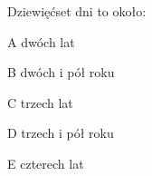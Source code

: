 \begin{tresc}
Dziewięćset dni to około:
\end{tresc}
\begin{wariant}{A} dwóch lat \end{wariant}
\begin{wariant}{B} dwóch i pół roku \end{wariant}
\begin{wariant}{C} trzech lat \end{wariant}
\begin{wariant}{D} trzech i pół roku \end{wariant}
\begin{wariant}{E} czterech lat \end{wariant}
